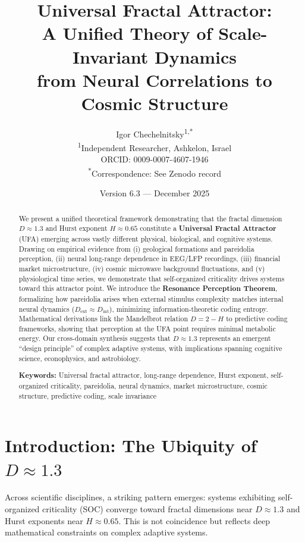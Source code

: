 \documentclass[11pt,a4paper]{article}
\title{\textbf{Universal Fractal Attractor: \\
A Unified Theory of Scale-Invariant Dynamics \\
from Neural Correlations to Cosmic Structure}}
\author{
Igor Chechelnitsky\textsuperscript{1,*} \\[0.3cm]
\textsuperscript{1}Independent Researcher, Ashkelon, Israel \\
ORCID: 0009-0007-4607-1946 \\[0.2cm]
\textsuperscript{*}Correspondence: See Zenodo record
}
\date{Version 6.3 --- December 2025}
\begin{document}
\maketitle

\begin{abstract}
We present a unified theoretical framework demonstrating that the fractal dimension $D \approx 1.3$ and Hurst exponent $H \approx 0.65$ constitute a \textbf{Universal Fractal Attractor} (UFA) emerging across vastly different physical, biological, and cognitive systems. Drawing on empirical evidence from (i) geological formations and pareidolia perception, (ii) neural long-range dependence in EEG/LFP recordings, (iii) financial market microstructure, (iv) cosmic microwave background fluctuations, and (v) physiological time series, we demonstrate that self-organized criticality drives systems toward this attractor point. We introduce the \textbf{Resonance Perception Theorem}, formalizing how pareidolia arises when external stimulus complexity matches internal neural dynamics ($D_{\text{ext}} \approx D_{\text{int}}$), minimizing information-theoretic coding entropy. Mathematical derivations link the Mandelbrot relation $D = 2 - H$ to predictive coding frameworks, showing that perception at the UFA point requires minimal metabolic energy. Our cross-domain synthesis suggests that $D \approx 1.3$ represents an emergent ``design principle'' of complex adaptive systems, with implications spanning cognitive science, econophysics, and astrobiology.

\vspace{0.5cm}
\noindent\textbf{Keywords:} Universal fractal attractor, long-range dependence, Hurst exponent, self-organized criticality, pareidolia, neural dynamics, market microstructure, cosmic structure, predictive coding, scale invariance
\end{abstract}

\tableofcontents
\newpage

\section{Introduction: The Ubiquity of $D \approx 1.3$}

Across scientific disciplines, a striking pattern emerges: systems exhibiting self-organized criticality (SOC) converge toward fractal dimensions near $D \approx 1.3$ and Hurst exponents near $H \approx 0.65$. This is not coincidence but reflects deep mathematical constraints on complex adaptive systems.
\end{document}
